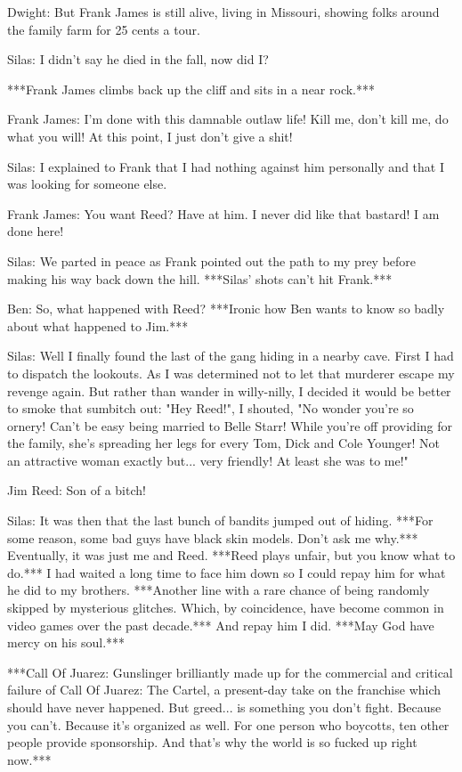 \documentclass{article}
\begin{document}
Dwight: But Frank James is still alive, living in Missouri, showing folks around the family farm for 25 cents a tour.

Silas: I didn't say he died in the fall, now did I?

***Frank James climbs back up the cliff and sits in a near rock.***

Frank James: I'm done with this damnable outlaw life! Kill me, don't kill me, do what you will! At this point, I just don't give a shit!

Silas: I explained to Frank that I had nothing against him personally and that I was looking for someone else.

Frank James: You want Reed? Have at him. I never did like that bastard! I am done here!

Silas: We parted in peace as Frank pointed out the path to my prey before making his way back down the hill. ***Silas' shots can't hit Frank.***

Ben: So, what happened with Reed? ***Ironic how Ben wants to know so badly about what happened to Jim.***

Silas: Well I finally found the last of the gang hiding in a nearby cave. First I had to dispatch the lookouts. As I was determined not to let that murderer escape my revenge again. But rather than wander in willy-nilly, I decided it would be better to smoke that sumbitch out: "Hey Reed!", I shouted, "No wonder you're so ornery! Can't be easy being married to Belle Starr! While you're off providing for the family, she's spreading her legs for every Tom, Dick and Cole Younger! Not an attractive woman exactly but... very friendly! At least she was to me!"

Jim Reed: Son of a bitch!

Silas: It was then that the last bunch of bandits jumped out of hiding. ***For some reason, some bad guys have black skin models. Don't ask me why.*** Eventually, it was just me and Reed. ***Reed plays unfair, but you know what to do.*** I had waited a long time to face him down so I could repay him for what he did to my brothers. ***Another line with a rare chance of being randomly skipped by mysterious glitches. Which, by coincidence, have become common in video games over the past decade.*** And repay him I did. ***May God have mercy on his soul.***

***Call Of Juarez: Gunslinger brilliantly made up for the commercial and critical failure of Call Of Juarez: The Cartel, a present-day take on the franchise which should have never happened. But greed... is something you don't fight. Because you can't. Because it's organized as well. For one person who boycotts, ten other people provide sponsorship. And that's why the world is so fucked up right now.***
\end{document}
